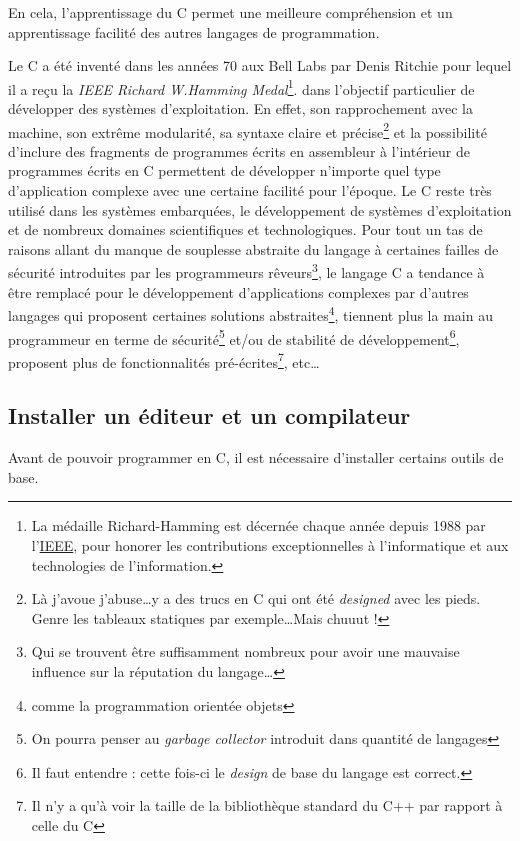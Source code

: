\documentclass[../../main.tex]{subfiles}
\begin{document}
En cela, l'apprentissage du C permet une meilleure compréhension et un apprentissage facilité des autres langages de programmation.

Le C a été inventé dans les années 70 aux Bell Labs par Denis Ritchie pour lequel il a reçu la \textit{IEEE Richard W.Hamming Medal}\footnote{La médaille Richard-Hamming est décernée chaque année depuis 1988 par l'\href{https://fr.wikipedia.org/wiki/Institute_of_Electrical_and_Electronics_Engineers}{IEEE}, pour honorer les contributions exceptionnelles à l'informatique et aux technologies de l'information.}. dans l'objectif particulier de développer des systèmes d'exploitation. En effet, son rapprochement avec la machine, son extrême modularité, sa syntaxe claire et précise\footnote{Là j'avoue j'abuse\dots y a des trucs en C qui ont été \textit{designed} avec les pieds. Genre les tableaux statiques par exemple\dots Mais chuuut !} et la possibilité d'inclure des fragments de programmes écrits en assembleur à l'intérieur de programmes écrits en C permettent de développer n'importe quel type d'application complexe avec une certaine facilité pour l'époque. Le C reste très utilisé dans les systèmes embarquées, le développement de systèmes d'exploitation et de nombreux domaines scientifiques et technologiques. Pour tout un tas de raisons allant du manque de souplesse abstraite du langage à certaines failles de sécurité introduites par les programmeurs rêveurs\footnote{Qui se trouvent être suffisamment nombreux pour avoir une mauvaise influence sur la réputation du langage\dots}, le langage C a tendance à être remplacé pour le développement d'applications complexes par d'autres langages qui proposent certaines solutions abstraites\footnote{comme la programmation orientée objets}, tiennent plus la main au programmeur en terme de sécurité\footnote{On pourra penser au \textit{garbage collector} introduit dans quantité de langages} et/ou de stabilité de développement\footnote{Il faut entendre : cette fois-ci le \textit{design} de base du langage est correct.}, proposent plus de fonctionnalités pré-écrites\footnote{Il n'y a qu'à voir la taille de la bibliothèque standard du C++ par rapport à celle du C}, etc\dots
\subsection{Installer un éditeur et un compilateur}\label{sub:installer_un_diteur_et_un_compilateur}
Avant de pouvoir programmer en C, il est nécessaire d'installer certains outils de base.
\end{document}
